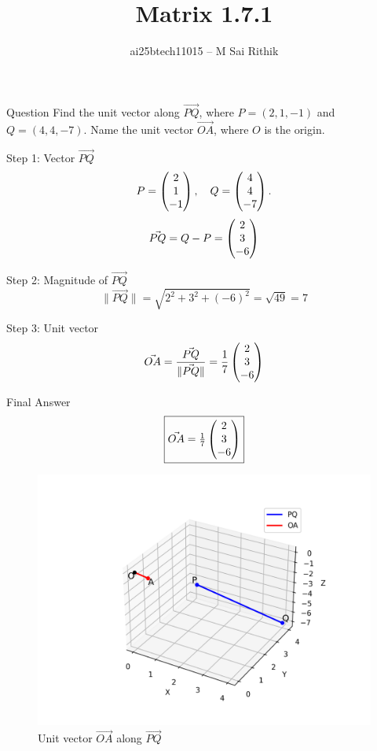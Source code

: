\documentclass{beamer}
\title{Matrix 1.7.1}
\author{ai25btech11015 -- M Sai Rithik}
\date{}
\begin{document}
\frame{\titlepage}

\begin{frame}{Question}
Find the unit vector along $\Vec{PQ}$, where $P=(2,1,-1)$ and $Q=(4,4,-7)$.  
Name the unit vector $\Vec{OA}$, where $O$ is the origin.
\end{frame}

\begin{frame}{Step 1: Vector $\Vec{PQ}$}
\[
P = \begin{pmatrix}2 \\ 1 \\ -1\end{pmatrix}, 
\quad Q = \begin{pmatrix}4 \\ 4 \\ -7\end{pmatrix}.
\]
\begin{equation}
\Vec{PQ} = Q - P = \begin{pmatrix}2 \\ 3 \\ -6\end{pmatrix}
\end{equation}
\end{frame}

\begin{frame}{Step 2: Magnitude of $\Vec{PQ}$}
\begin{equation}
\|\Vec{PQ}\| = \sqrt{2^2 + 3^2 + (-6)^2}
= \sqrt{49} = 7
\end{equation}
\end{frame}

\begin{frame}{Step 3: Unit vector}
\begin{equation}
\Vec{OA} = \frac{\Vec{PQ}}{\|\Vec{PQ}\|}
= \frac{1}{7}\begin{pmatrix}2 \\ 3 \\ -6\end{pmatrix}
\end{equation}
\end{frame}

\begin{frame}{Final Answer}
\[
\boxed{\Vec{OA} = \tfrac{1}{7}\begin{pmatrix}2 \\ 3 \\ -6\end{pmatrix}}
\]

\begin{figure}[h!]
    \centering
    \includegraphics[width=0.6\linewidth]{figs/fig.png}
    \caption{Unit vector $\Vec{OA}$ along $\Vec{PQ}$}
\end{figure}
\end{frame}
\end{document}
